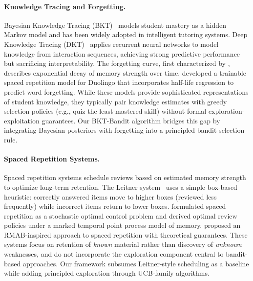 \paragraph{Knowledge Tracing and Forgetting.}
Bayesian Knowledge Tracing (BKT)~\citep{corbett1994knowledge} models student mastery as a hidden Markov model and has been widely adopted in intelligent tutoring systems.
Deep Knowledge Tracing (DKT)~\citep{piech2015deep} applies recurrent neural networks to model knowledge from interaction sequences, achieving strong predictive performance but sacrificing interpretability.
The forgetting curve, first characterized by \citet{ebbinghaus1885memory}, describes exponential decay of memory strength over time.
\citet{settles2016trainable} developed a trainable spaced repetition model for Duolingo that incorporates half-life regression to predict word forgetting.
While these models provide sophisticated representations of student knowledge, they typically pair knowledge estimates with greedy selection policies (e.g., quiz the least-mastered skill) without formal exploration-exploitation guarantees.
Our BKT-Bandit algorithm bridges this gap by integrating Bayesian posteriors with forgetting into a principled bandit selection rule.

\paragraph{Spaced Repetition Systems.}
Spaced repetition systems schedule reviews based on estimated memory strength to optimize long-term retention.
The Leitner system~\citep{leitner1972so} uses a simple box-based heuristic: correctly answered items move to higher boxes (reviewed less frequently) while incorrect items return to lower boxes.
\citet{tabibian2019enhancing} formulated spaced repetition as a stochastic optimal control problem and derived optimal review policies under a marked temporal point process model of memory.
\citet{reddy2016unbounded} proposed an RMAB-inspired approach to spaced repetition with theoretical guarantees.
These systems focus on retention of \emph{known} material rather than discovery of \emph{unknown} weaknesses, and do not incorporate the exploration component central to bandit-based approaches.
Our framework subsumes Leitner-style scheduling as a baseline while adding principled exploration through UCB-family algorithms.

